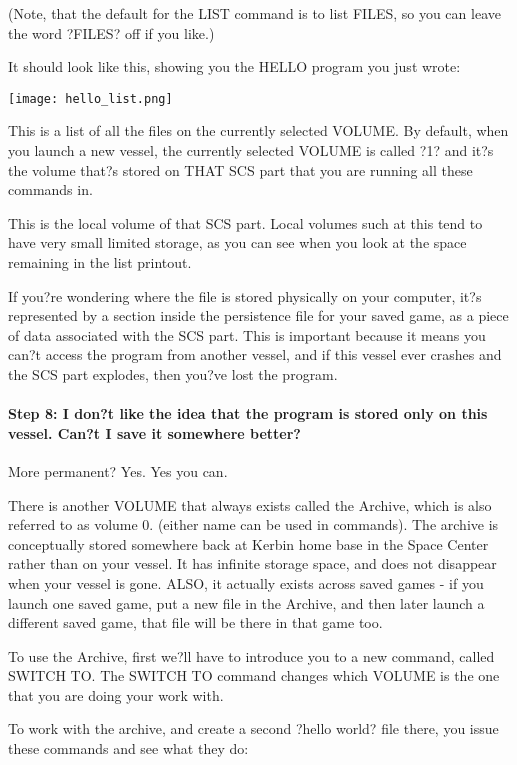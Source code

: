 (Note, that the default for the LIST command is to list FILES, so you can leave the word ?FILES? off if you like.)

It should look like this, showing you the HELLO program you just wrote:

\begin{center}
\texttt{[image: hello\_list.png]}
\end{center}

This is a list of all the files on the currently selected VOLUME. By default, when you launch a new vessel, the currently selected VOLUME is called ?1? and it?s the volume that?s stored on THAT SCS part that you are running all these commands in.

This is the local volume of that SCS part. Local volumes such at this tend to have very small limited storage, as you can see when you look at the space remaining in the list printout.

If you?re wondering where the file is stored physically on your computer, it?s represented by a section inside the persistence file for your saved game, as a piece of data associated with the SCS part. This is important because it means you can?t access the program from another vessel, and if this vessel ever crashes and the SCS part explodes, then you?ve lost the program.

\paragraph{Step 8: I don?t like the idea that the program is stored only on this vessel. Can?t I save it somewhere better? }More permanent?
Yes. Yes you can.

There is another VOLUME that always exists called the Archive, which is also referred to as volume 0. (either name can be used in commands). The archive is conceptually stored somewhere back at Kerbin home base in the Space Center rather than on your vessel. It has infinite storage space, and does not disappear when your vessel is gone. ALSO, it actually exists across saved games - if you launch one saved game, put a new file in the Archive, and then later launch a different saved game, that file will be there in that game too.

To use the Archive, first we?ll have to introduce you to a new command, called SWITCH TO. The SWITCH TO command changes which VOLUME is the one that you are doing your work with.

To work with the archive, and create a second ?hello world? file there, you issue these commands and see what they do:

